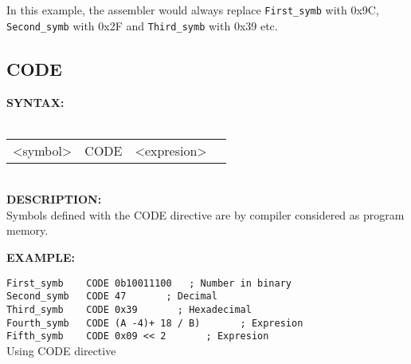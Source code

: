             In this example, the assembler would always replace {\color{highlight_symbol}\verb'First_symb'} with 0x9C,
            {\color{highlight_symbol}\verb'Second_symb'} with 0x2F and {\color{highlight_symbol}\verb'Third_symb'} with 0x39 etc.

                \subsection{CODE}
                \textbf{SYNTAX:}\\
                                \\ {
                                        \texttt{}
                                        \begin{tabular}[h!]{llll}
                                        { \color{highlight_symbol} <symbol> }  &
                                        { \color{highlight_directive} CODE } &
                                        { \color{highlight_constant} <expresion> } & { \color{highlight_comment}  }\\
                                        \end{tabular}
                                }
                                \\
                \textbf{DESCRIPTION:}\\
                Symbols defined with the CODE directive are by compiler considered as program memory.

                \textbf{EXAMPLE:}\\
                \begin{code}[h!]
                \mysmallfont{}
                            {\color{highlight_constant}\verb'First_symb'}\verb'    '{\color{highlight_directive}\verb'CODE'}\verb' '{\color{highlight_bin}\verb'0b10011100'}\verb'   '{\color{highlight_comment}\verb'; Number in binary'}\\
                            {\color{highlight_constant}\verb'Second_symb'}\verb'   '{\color{highlight_directive}\verb'CODE'}\verb' '{\color{highlight_oct}\verb'47'}\verb'       '{\color{highlight_comment}\verb'; Decimal'}\\
                            {\color{highlight_constant}\verb'Third_symb'}\verb'    '{\color{highlight_directive}\verb'CODE'}\verb' '{\color{highlight_dec}\verb'0x39'}\verb'       '{\color{highlight_comment}\verb'; Hexadecimal'}\\
                            {\color{highlight_constant}\verb'Fourth_symb'}\verb'   '{\color{highlight_directive}\verb'CODE'}\verb' '{\color{highlight_dec}\verb'(A -4)+ 18 / B)'}\verb'       '{\color{highlight_comment}\verb'; Expresion'}\\
                            {\color{highlight_constant}\verb'Fifth_symb'}\verb'    '{\color{highlight_directive}\verb'CODE'}\verb' '{\color{highlight_dec}\verb'0x09 << 2'}\verb'       '{\color{highlight_comment}\verb'; Expresion'}\\
                            \caption{Using CODE directive}
                \end{code}

